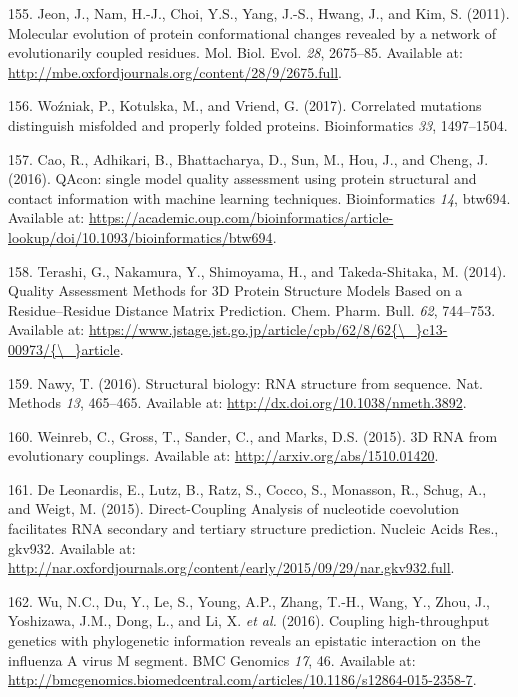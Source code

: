 \documentclass[11pt,a4paper,twoside]{book}
\theoremstyle{definition}
\theoremstyle{definition}
\theoremstyle{remark}
\begin{document}
\hypertarget{ref-Jeon2011a}{}
155. Jeon, J., Nam, H.-J., Choi, Y.S., Yang, J.-S., Hwang, J., and Kim,
S. (2011). Molecular evolution of protein conformational changes
revealed by a network of evolutionarily coupled residues. Mol. Biol.
Evol. \emph{28}, 2675--85. Available at:
\url{http://mbe.oxfordjournals.org/content/28/9/2675.full}.

\hypertarget{ref-Wozniak2017}{}
156. Woźniak, P., Kotulska, M., and Vriend, G. (2017). Correlated
mutations distinguish misfolded and properly folded proteins.
Bioinformatics \emph{33}, 1497--1504.

\hypertarget{ref-Cao2016}{}
157. Cao, R., Adhikari, B., Bhattacharya, D., Sun, M., Hou, J., and
Cheng, J. (2016). QAcon: single model quality assessment using protein
structural and contact information with machine learning techniques.
Bioinformatics \emph{14}, btw694. Available at:
\url{https://academic.oup.com/bioinformatics/article-lookup/doi/10.1093/bioinformatics/btw694}.

\hypertarget{ref-Terashi2014a}{}
158. Terashi, G., Nakamura, Y., Shimoyama, H., and Takeda-Shitaka, M.
(2014). Quality Assessment Methods for 3D Protein Structure Models Based
on a Residue--Residue Distance Matrix Prediction. Chem. Pharm. Bull.
\emph{62}, 744--753. Available at:
\href{https://www.jstage.jst.go.jp/article/cpb/62/8/62\%7B/_\%7Dc13-00973/\%7B/_\%7Darticle}{https://www.jstage.jst.go.jp/article/cpb/62/8/62\{\textbackslash{}\_\}c13-00973/\{\textbackslash{}\_\}article}.

\hypertarget{ref-Nawy2016}{}
159. Nawy, T. (2016). Structural biology: RNA structure from sequence.
Nat. Methods \emph{13}, 465--465. Available at:
\url{http://dx.doi.org/10.1038/nmeth.3892}.

\hypertarget{ref-Weinreb2015}{}
160. Weinreb, C., Gross, T., Sander, C., and Marks, D.S. (2015). 3D RNA
from evolutionary couplings. Available at:
\url{http://arxiv.org/abs/1510.01420}.

\hypertarget{ref-DeLeonardis2015a}{}
161. De Leonardis, E., Lutz, B., Ratz, S., Cocco, S., Monasson, R.,
Schug, A., and Weigt, M. (2015). Direct-Coupling Analysis of nucleotide
coevolution facilitates RNA secondary and tertiary structure prediction.
Nucleic Acids Res., gkv932. Available at:
\url{http://nar.oxfordjournals.org/content/early/2015/09/29/nar.gkv932.full}.

\hypertarget{ref-Wu2016}{}
162. Wu, N.C., Du, Y., Le, S., Young, A.P., Zhang, T.-H., Wang, Y.,
Zhou, J., Yoshizawa, J.M., Dong, L., and Li, X. \emph{et al.} (2016).
Coupling high-throughput genetics with phylogenetic information reveals
an epistatic interaction on the influenza A virus M segment. BMC
Genomics \emph{17}, 46. Available at:
\url{http://bmcgenomics.biomedcentral.com/articles/10.1186/s12864-015-2358-7}.
\end{document}
